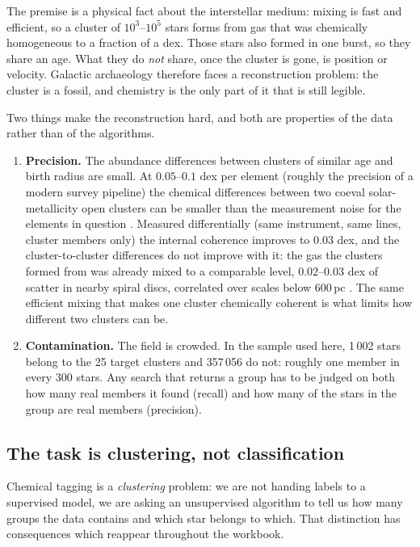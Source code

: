 The premise is a physical fact about the interstellar medium: mixing is fast
and efficient, so a cluster of $10^3$--$10^5$ stars forms from gas that was
chemically homogeneous to a fraction of a dex. Those stars also formed in one
burst, so they share an age. What they do \emph{not} share, once the cluster
is gone, is position or velocity. Galactic archaeology therefore faces a
reconstruction problem: the cluster is a fossil, and chemistry is the only
part of it that is still legible.

Two things make the reconstruction hard, and both are properties of the data
rather than of the algorithms.

\begin{enumerate}
\item \textbf{Precision.} The abundance differences between clusters of similar
age and birth radius are small. At $0.05$--$0.1$ dex per element (roughly the
precision of a modern survey pipeline) the chemical differences between two
coeval solar-metallicity open clusters can be smaller than the measurement
noise for the elements in question \citep{GarciaDias:19, Casamiquela:21}.
Measured differentially (same instrument, same lines, cluster members only) the
internal coherence improves to $0.03$ dex, and the cluster-to-cluster
differences do not improve with it: the gas the clusters formed from was
already mixed to a comparable level, $0.02$--$0.03$ dex of scatter in nearby
spiral discs, correlated over scales below $600$\,pc \citep{Kreckel:20}. The
same efficient mixing that makes one cluster chemically coherent is what limits
how different two clusters can be.
\item \textbf{Contamination.} The field is crowded. In the sample used here,
  1\,002 stars belong to the 25 target clusters and 357\,056 do not: roughly
  one member in every 300 stars. Any search that returns a group has to be
  judged on both how many real members it found (recall) and how many of the
  stars in the group are real members (precision).
\end{enumerate}

\subsection{The task is clustering, not classification}

Chemical tagging is a \emph{clustering} problem: we are not handing labels to
a supervised model, we are asking an unsupervised algorithm to tell us how
many groups the data contains and which star belongs to which. That
distinction has consequences which reappear throughout the workbook.

